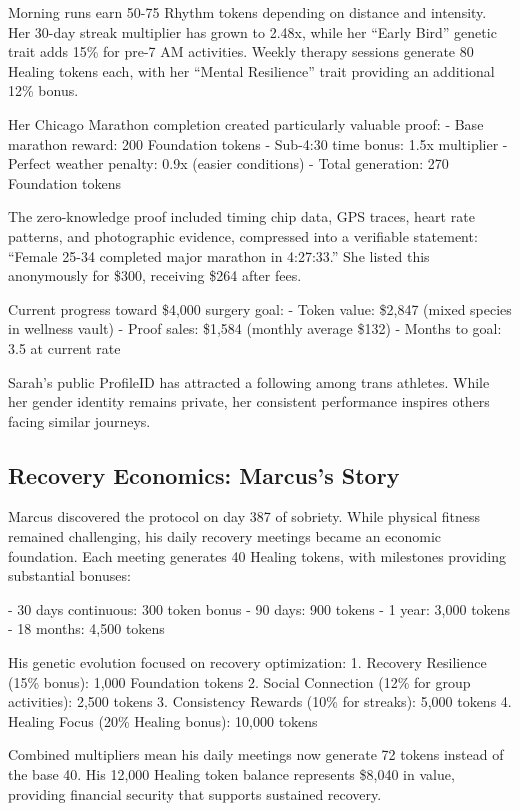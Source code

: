 \documentclass[11pt,letterpaper]{article}
\begin{document}
Morning runs earn 50-75 Rhythm tokens depending on distance and intensity. Her 30-day streak multiplier has grown to 2.48x, while her ``Early Bird'' genetic trait adds 15\% for pre-7 AM activities. Weekly therapy sessions generate 80 Healing tokens each, with her ``Mental Resilience'' trait providing an additional 12\% bonus.

Her Chicago Marathon completion created particularly valuable proof:
- Base marathon reward: 200 Foundation tokens
- Sub-4:30 time bonus: 1.5x multiplier
- Perfect weather penalty: 0.9x (easier conditions)
- Total generation: 270 Foundation tokens

The zero-knowledge proof included timing chip data, GPS traces, heart rate patterns, and photographic evidence, compressed into a verifiable statement: ``Female 25-34 completed major marathon in 4:27:33.'' She listed this anonymously for \$300, receiving \$264 after fees.

Current progress toward \$4,000 surgery goal:
- Token value: \$2,847 (mixed species in wellness vault)
- Proof sales: \$1,584 (monthly average \$132)
- Months to goal: 3.5 at current rate

Sarah's public ProfileID has attracted a following among trans athletes. While her gender identity remains private, her consistent performance inspires others facing similar journeys.

\subsection{Recovery Economics: Marcus's Story}

Marcus discovered the protocol on day 387 of sobriety. While physical fitness remained challenging, his daily recovery meetings became an economic foundation. Each meeting generates 40 Healing tokens, with milestones providing substantial bonuses:

- 30 days continuous: 300 token bonus
- 90 days: 900 tokens
- 1 year: 3,000 tokens
- 18 months: 4,500 tokens

His genetic evolution focused on recovery optimization:
1. Recovery Resilience (15\% bonus): 1,000 Foundation tokens
2. Social Connection (12\% for group activities): 2,500 tokens
3. Consistency Rewards (10\% for streaks): 5,000 tokens
4. Healing Focus (20\% Healing bonus): 10,000 tokens

Combined multipliers mean his daily meetings now generate 72 tokens instead of the base 40. His 12,000 Healing token balance represents \$8,040 in value, providing financial security that supports sustained recovery.
\end{document}
